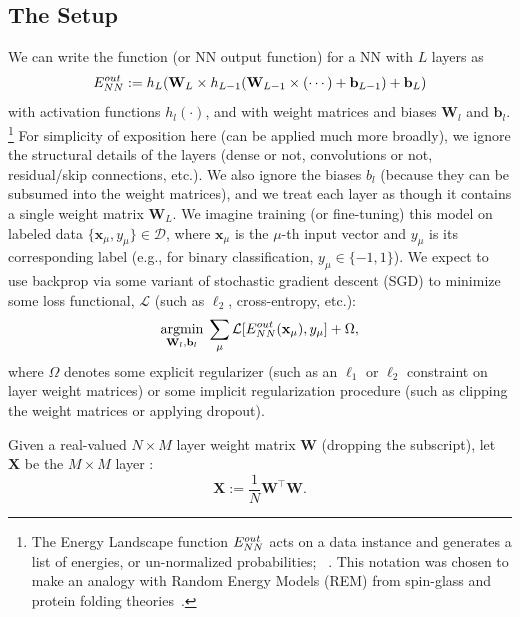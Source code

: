 \subsection{The \HTSR Setup}
\label{sxn:htsr_setup}

We can write the \EnergyLandscape function 
(or NN output function) for a 
NN with $L$ layers as
\begin{equation}
\label{eqn:dnn_energy}
E^{out}_{NN}:=h_{L}(\mathbf{W}_{L}\times h_{L-1}(\mathbf{W}_{L-1}\times(\cdots)+\mathbf{b}_{L-1})+\mathbf{b}_{L}) 
\end{equation}
with activation functions $h_{l}(\cdot)$, and with weight matrices and biases $\mathbf{W}_{l}$ and $\mathbf{b}_{l}$.%
\footnote{The Energy Landscape function $E^{out}_{NN}$ acts on a data instance and generates a list of energies, or un-normalized probabilities;
~\cite{MM18_TR_JMLRversion}.
This notation was chosen to make an analogy with Random Energy Models (REM)
from spin-glass and protein folding theories~\cite{DerridaREM1981, BryngelsonWolynesPNAS1987}.
}
For simplicity of exposition here (\HTSR can be applied much more broadly), we ignore the structural details of the layers (dense or not, convolutions or not, residual/skip connections, etc.).
We also ignore the biases $b_{l}$ (because they can be subsumed into the weight matrices),
and we treat each layer as though it contains a single weight matrix $\mathbf{W}_{L}$.
We imagine training (or fine-tuning) this model on labeled data $\{\mathbf{x}_{\mu},y_{\mu}\}\in\mathcal{D}$, where $ \mathbf{x}_\mu $ is the $\mu$-th input vector and $y_\mu$ is its corresponding label (e.g., for binary classification, $y_{\mu}\in\{-1,1\}$).
We expect to use backprop via some variant of stochastic gradient descent (SGD) to minimize some loss functional, $\mathcal{L}$ (such as $\ell_2$, cross-entropy, etc.):  
\begin{equation}
\underset{\mathbf{W}_{l},\mathbf{b}_{l}}{\text{argmin}}\;\sum_{\mu}\mathcal{L}[E^{out}_{NN}(\mathbf{x}_{\mu}),y_{\mu}]+\Omega ,
\label{eqn:dnn_opt}
\end{equation}
where $\Omega$ denotes some explicit regularizer (such as an $\ell_1$ or $\ell_2$ constraint on layer weight matrices) or some implicit regularization procedure (such as clipping the weight matrices or applying dropout).

Given a real-valued $N\times M$ layer weight matrix $\mathbf{W}$ (dropping the subscript), let $\mathbf{X}$ be the $M \times M$ layer \emph{\CorrelationMatrix}:
\begin{equation}
\mathbf{X}:=\dfrac{1}{N}\mathbf{W}^{\top}\mathbf{W} .
\label{eqn:X}
\end{equation}

